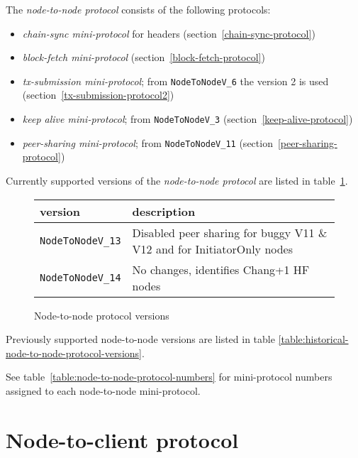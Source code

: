 The \textit{node-to-node protocol} consists of the following protocols:
\begin{itemize}
  \item \textit{chain-sync mini-protocol} for headers (section~\ref{chain-sync-protocol})
  \item \textit{block-fetch mini-protocol} (section~\ref{block-fetch-protocol})
  \item \textit{tx-submission mini-protocol};  from \texttt{NodeToNodeV\_6} the version
    2 is used  (section~\ref{tx-submission-protocol2})
  \item \textit{keep alive mini-protocol}; from \texttt{NodeToNodeV\_3} (section~\ref{keep-alive-protocol})
  \item \textit{peer-sharing mini-protocol}; from \texttt{NodeToNodeV\_11} (section~\ref{peer-sharing-protocol})
\end{itemize}
Currently supported versions of the \textit{node-to-node protocol} are listed
in table~\ref{table:node-to-node-protocol-versions}.
\begin{figure}[h]
  \begin{center}
    \begin{tabular}{l|l}
      version         & description \\\hline\hline
      \texttt{NodeToNodeV\_13} & Disabled peer sharing for buggy V11 \& V12 and for InitiatorOnly nodes \\\hline
      \texttt{NodeToNodeV\_14} & No changes, identifies Chang+1 HF nodes\\\hline
    \end{tabular}
    \caption{Node-to-node protocol versions}
    \label{table:node-to-node-protocol-versions}
  \end{center}
\end{figure}
\newline
Previously supported node-to-node versions are listed in table \ref{table:historical-node-to-node-protocol-versions}.

See table~\ref{table:node-to-node-protocol-numbers} for mini-protocol numbers
assigned to each node-to-node mini-protocol.

\section{Node-to-client protocol}
\label{section:node-to-client-protocol}
\newline
{}\newline

